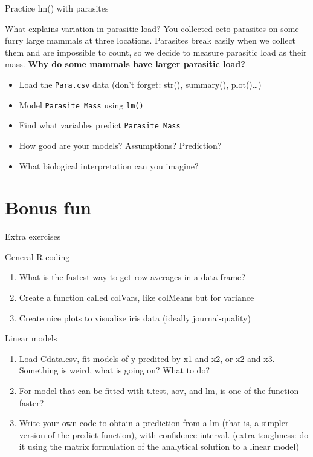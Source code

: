 \documentclass[10pt]{beamer}\usepackage[]{graphicx}\usepackage[]{color}
\begin{document}
\begin{frame}[fragile]{Practice lm() with parasites}


  
  \begin{alertblock}{What explains variation in parasitic load?}
  You collected ecto-parasites on some furry large mammals at three locations. Parasites break easily when we collect them and are impossible to count, so we decide to measure parasitic load as their mass. \textbf{Why do some mammals have larger parasitic load?} \pause
    \begin{itemize}
      \item Load the \texttt{Para.csv} data (don't forget: str(), summary(), plot()\dots)
      \item Model \verb+Parasite_Mass+ using \texttt{lm()}
      \item Find what variables predict \verb+Parasite_Mass+
      \item How good are your models? Assumptions? Prediction?
      \item What biological interpretation can you imagine?
      \end{itemize}
  \end{alertblock}
  
\end{frame}
\section{Bonus fun}
\begin{frame}{Extra exercises}



\begin{alertblock}{General R coding}
  \begin{enumerate}
    \item What is the fastest way to get row averages in a data-frame?
    \item Create a function called colVars, like colMeans but for variance
    \item Create nice plots to visualize iris data (ideally journal-quality)
  \end{enumerate}
\end{alertblock}

\begin{alertblock}{Linear models}
  \begin{enumerate}
    \item Load Cdata.csv, fit models of y predited by x1 and x2, or x2 and x3. Something is weird, what is going on? What to do?
    \item For model that can be fitted with t.test, aov, and lm, is one of the function faster?
    \item Write your own code to obtain a prediction from a lm (that is, a simpler version of the predict function), with confidence interval. (extra toughness: do it using the matrix formulation of the analytical solution to a linear model)
  \end{enumerate}
\end{alertblock}
\end{frame}
\end{document}
